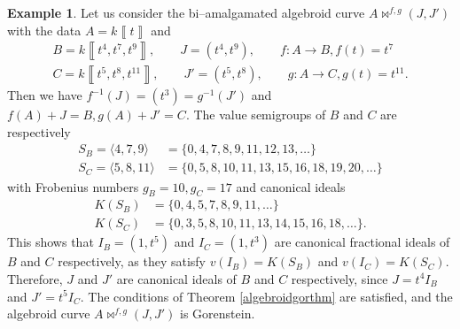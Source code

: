 \documentclass{amsart}%
\theoremstyle{plain}
\numberwithin{equation}{section}
\theoremstyle{definition}
\newtheorem{example}{Example}[section]
\begin{document}
\begin{example}
    Let us consider the bi--amalgamated algebroid curve $A\bowtie^{f,g}(J,J')$ with the data $A=k\left\llbracket t \right\rrbracket$ and
    \begin{gather*}
        B=k\left\llbracket t^4,t^7,t^9  \right\rrbracket,\qquad J=\left( t^4,t^9 \right),\qquad f:A\to B, f(t)=t^7\\
        C=k\left\llbracket t^5,t^8,t^{11}  \right\rrbracket, \qquad J'=\left( t^5,t^8 \right),\qquad g:A\to C, g(t)=t^{11}.
    \end{gather*}
    Then we have $f^{-1}(J)=\left(t^3\right)=g^{-1}(J')$ and $f(A)+J=B, g(A)+J'=C$. The value semigroups of $B$ and $C$ are respectively 
    \begin{align*}
        S_B=\langle4,7,9\rangle&=\{0,4,7,8,9,11,12,13,\ldots\}\\
        S_C=\langle5,8,11\rangle&=\{0,5,8,10,11,13,15,16,18,19,20,\ldots\}
    \end{align*}
    with Frobenius numbers $g_B=10, g_C=17$ and canonical ideals
    \begin{align*}
        K(S_B)&=\{0,4,5,7,8,9,11,\ldots\}\\
        K(S_C)&=\{0,3,5,8,10,11,13,14,15,16,18,\ldots\}.
    \end{align*}
    This shows that $I_B=\left(1,t^5\right)$ and $I_C=\left(1,t^3\right)$ are canonical fractional ideals of $B$ and $C$ respectively, as they satisfy $v(I_B)=K(S_B)$ and $v(I_C)=K(S_C)$. Therefore, $J$ and $J'$ are canonical ideals of $B$ and $C$ respectively, since $J=t^4 I_B$ and $J'=t^5 I_C$. The conditions of Theorem \ref{algebroidgorthm} are satisfied, and the algebroid curve $A\bowtie^{f,g}(J,J')$ is Gorenstein.

\begin{figure}[ht]
\centering
{}
\end{figure}
\end{example}
\end{document}
